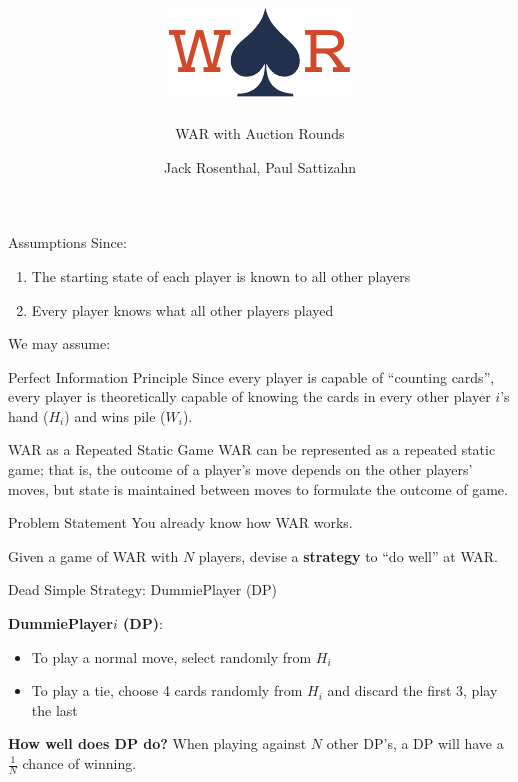\documentclass{slides}
\title{\includegraphics[width=0.5\paperwidth]{graphics/war.pdf}}
\subtitle{WAR with Auction Rounds}
\author{Jack Rosenthal, Paul Sattizahn}
\institute{CSCI-410: Game Theory \& Networks}
\begin{document}
\begin{frame}{Assumptions}
    Since:
    \begin{enumerate}
        \item The starting state of each player is known to all other players
        \item Every player knows what all other players played
    \end{enumerate}

    \bigskip

    We may assume:

    \begin{block}{Perfect Information Principle}
        Since every player is capable of ``counting cards'', every player is
        theoretically capable of knowing the cards in every other player $i$'s
        hand ($H_i$) and wins pile ($W_i$).
    \end{block}

\end{frame}

\begin{frame}{WAR as a Repeated Static Game}
    WAR can be represented as a repeated static game; that is, the outcome of a
    player's move depends on the other players' moves, but state is maintained
    between moves to formulate the outcome of game.
\end{frame}

\begin{frame}{Problem Statement}
    You already know how WAR works.

    \pause
    \bigskip

    Given a game of WAR with $N$ players, devise a \textbf{strategy} to ``do
    well'' at WAR.
\end{frame}

\begin{frame}{Dead Simple Strategy: DummiePlayer (DP)}

    \textbf{DummiePlayer$i$ (DP)}:
    \begin{itemize}
        \item To play a normal move, select randomly from $H_i$
        \item To play a tie, choose 4 cards randomly from $H_i$ and discard the
            first 3, play the last
    \end{itemize}

    \pause
    \bigskip

    \textbf{How well does DP do?} When playing against $N$ other DP's, a
    DP will have a $\frac1N$ chance of winning.

\end{frame}
\end{document}
